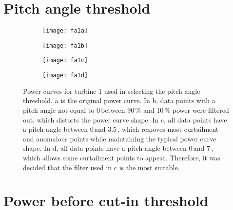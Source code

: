 
\chapter{Pitch angle threshold}\label{a1}

\begin{figure}
    \centering
    \begin{subfigure}[t]{.5\textwidth}
        \centering
        \texttt{[image: fa1a]}
        \caption{}
    \end{subfigure}%
    \begin{subfigure}[t]{.5\textwidth}
        \centering
        \texttt{[image: fa1b]}
        \caption{}
    \end{subfigure}
    \begin{subfigure}[t]{.49\textwidth}
        \centering
        \texttt{[image: fa1c]}
        \caption{}
    \end{subfigure}
    \begin{subfigure}[t]{.49\textwidth}
        \centering
        \texttt{[image: fa1d]}
        \caption{}
    \end{subfigure}
    \captionsetup{labelformat=empty,list=no}
    \caption{Power curves for turbine 1 used in selecting the pitch angle threshold. a is the original power curve. In b, data points with a pitch angle not equal to 0\,\textdegree between 90\,\% and 10\,\% power were filtered out, which distorts the power curve shape. In c, all data points have a pitch angle between 0\,\textdegree and 3.5\,\textdegree, which removes most curtailment and anomalous points while maintaining the typical power curve shape. In d, all data points have a pitch angle between 0\,\textdegree and 7\,\textdegree, which allows some curtailment points to appear. Therefore, it was decided that the filter used in c is the most suitable.}
\end{figure}

\chapter{Power before cut-in threshold}\label{a2}

